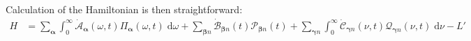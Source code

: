 \documentclass{article}
\begin{document}
Calculation of the Hamiltonian is then straightforward:
\begin{equation}\label{eq:classicalHamiltonian}
\begin{split}
H &= \sum_{\bm{\alpha}}\int_0^\infty\dot{\mathcal{A}}_{\bm{\alpha}}(\omega,t)\mathit{\Pi}_{\bm{\alpha}}(\omega,t)\;\mathrm{d}\omega + \sum_{\bm{\beta}n}\dot{\mathcal{B}}_{\bm{\beta}n}(t)\mathcal{P}_{\bm{\beta}n}(t) + \sum_{\bm{\gamma}n}\int_0^\infty\dot{\mathcal{C}}_{\bm{\gamma}n}(\nu,t)\mathcal{Q}_{\bm{\gamma}n}(\nu,t)\;\mathrm{d}\nu - L'\\

\end{split}
\end{equation}
\end{document}
